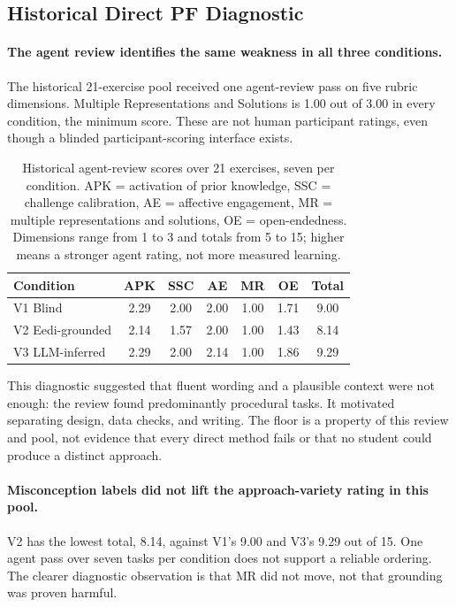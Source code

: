 \subsection{Historical Direct PF Diagnostic}
\label{sec:results-pf}

\paragraph{The agent review identifies the same weakness in all three conditions.} The historical 21-exercise pool received one agent-review pass on five rubric dimensions. Multiple Representations and Solutions is 1.00 out of 3.00 in every condition, the minimum score. These are not human participant ratings, even though a blinded participant-scoring interface exists.

\begin{table}[h]
\centering
\small
\begin{tabular}{@{}lccccc c@{}}
\toprule
\textbf{Condition} & \textbf{APK} & \textbf{SSC} & \textbf{AE} & \textbf{MR} & \textbf{OE} & \textbf{Total} \\
\midrule
V1 Blind            & 2.29 & 2.00 & 2.00 & 1.00 & 1.71 & 9.00 \\
V2 Eedi-grounded    & 2.14 & 1.57 & 2.00 & 1.00 & 1.43 & 8.14 \\
V3 LLM-inferred     & 2.29 & 2.00 & 2.14 & 1.00 & 1.86 & 9.29 \\
\bottomrule
\end{tabular}
\caption{Historical agent-review scores over 21 exercises, seven per condition. APK = activation of prior knowledge, SSC = challenge calibration, AE = affective engagement, MR = multiple representations and solutions, OE = open-endedness. Dimensions range from 1 to 3 and totals from 5 to 15; higher means a stronger agent rating, not more measured learning.}
\label{tab:pf-results}
\end{table}

This diagnostic suggested that fluent wording and a plausible context were not enough: the review found predominantly procedural tasks. It motivated separating design, data checks, and writing. The floor is a property of this review and pool, not evidence that every direct method fails or that no student could produce a distinct approach.

\paragraph{Misconception labels did not lift the approach-variety rating in this pool.} V2 has the lowest total, 8.14, against V1's 9.00 and V3's 9.29 out of 15. One agent pass over seven tasks per condition does not support a reliable ordering. The clearer diagnostic observation is that MR did not move, not that grounding was proven harmful.

